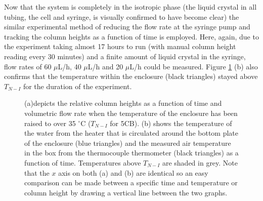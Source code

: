 Now that the system is completely in the isotropic phase (the liquid crystal in all tubing, the cell and syringe, is visually confirmed to have become clear) the similar experimental method of reducing the flow rate at the syringe pump and tracking the column heights as a function of time is employed. Here, again, due to the experiment taking almost 17 hours to run (with manual column height reading every 30 minutes) and a finite amount of liquid crystal in the syringe, flow rates of 60 $\mu$L/h, 40 $\mu$L/h and 20 $\mu$L/h could be measured. Figure \ref{fig:isotropic_left_to_right} (b) also confirms that the temperature within the enclosure (black triangles) stayed above $T_{N-I}$ for the duration of the experiment.

\begin{figure}
\begin{center}
\end{center}
\caption[Column heights in the isotropic phase (left to right)]{\label{fig:isotropic_left_to_right}(a)depicts the relative column heights as a function of time and volumetric flow rate when the temperature of the enclosure has been raised to over 35 $^{\circ}\text{C}$ ($T_{N-I}$ for 5CB). (b) shows the temperature of the water from the heater that is circulated around the bottom plate of the enclosure (blue triangles) and the measured air temperature in the box from the thermocouple thermometer (black triangles) as a function of time. Temperatures above $T_{N-I}$ are shaded in grey. Note that the $x$ axis on both (a) and (b) are identical so an easy comparison can be made between a specific time and temperature or column height by drawing a vertical line between the two graphs.}
\end{figure}


